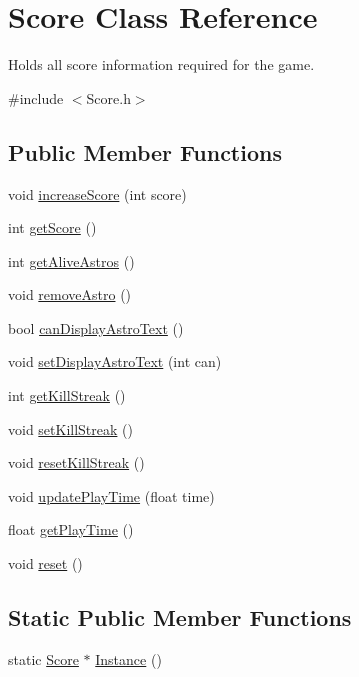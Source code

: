 \hypertarget{class_score}{}\section{Score Class Reference}
\label{class_score}


Holds all score information required for the game.  




{\ttfamily \#include $<$Score.\+h$>$}

\subsection*{Public Member Functions}
\begin{DoxyCompactItemize}
\item 
void \hyperlink{class_score_a9be80e91f6252cbb7c59d5212280e00f}{increase\+Score} (int score)
\item 
int \hyperlink{class_score_a8627c93270c188a3fd28a25b1d07a9e7}{get\+Score} ()
\item 
int \hyperlink{class_score_ad997fd059028945d10cfc8c056540a4f}{get\+Alive\+Astros} ()
\item 
void \hyperlink{class_score_ac826af8103f602c71d75d36aeecdff35}{remove\+Astro} ()
\item 
bool \hyperlink{class_score_a915cd675992bb150fcd67b43f7b8732e}{can\+Display\+Astro\+Text} ()
\item 
void \hyperlink{class_score_a3b9b2184527917932481449f410ab3ed}{set\+Display\+Astro\+Text} (int can)
\item 
int \hyperlink{class_score_a3bd9796efe8e7cf9bb1c97597e56bc01}{get\+Kill\+Streak} ()
\item 
void \hyperlink{class_score_af0065ea2bf0bf3c1dc92140a1f7e371f}{set\+Kill\+Streak} ()
\item 
void \hyperlink{class_score_a152a46eb1f165db706409369d4da7959}{reset\+Kill\+Streak} ()
\item 
void \hyperlink{class_score_a767d18294e41930ccece6d48c2398537}{update\+Play\+Time} (float time)
\item 
float \hyperlink{class_score_ae4fc66274baac2f13975f6139681b52c}{get\+Play\+Time} ()
\item 
void \hyperlink{class_score_a32804ba9a847e58160e6e0cef46e1f25}{reset} ()
\end{DoxyCompactItemize}
\subsection*{Static Public Member Functions}
\begin{DoxyCompactItemize}
\item 
static \hyperlink{class_score}{Score} $\ast$ \hyperlink{class_score_a7d5516454642a247be184d5063404d04}{Instance} ()
\end{DoxyCompactItemize}


